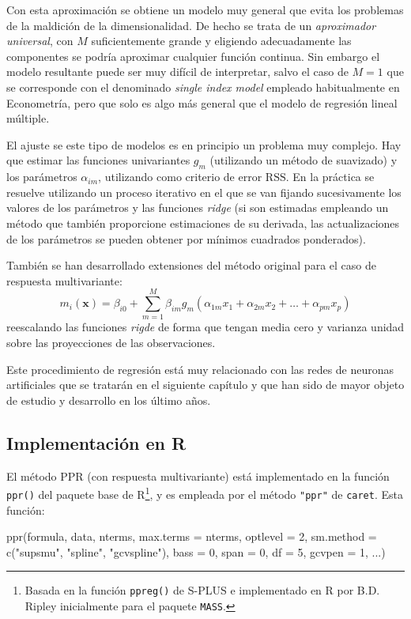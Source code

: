 \documentclass[
  spanish,
]{book}
\newenvironment{Shaded}{\begin{snugshade}}{\end{snugshade}}
\newcommand{\AttributeTok}[1]{\textcolor[rgb]{0.77,0.63,0.00}{#1}}
\newcommand{\DecValTok}[1]{\textcolor[rgb]{0.00,0.00,0.81}{#1}}
\newcommand{\FunctionTok}[1]{\textcolor[rgb]{0.00,0.00,0.00}{#1}}
\newcommand{\NormalTok}[1]{#1}
\newcommand{\StringTok}[1]{\textcolor[rgb]{0.31,0.60,0.02}{#1}}
\theoremstyle{break}
\theoremstyle{definition}
\theoremstyle{definition}
\theoremstyle{definition}
\theoremstyle{definition}
\theoremstyle{remark}
\begin{document}
Con esta aproximación se obtiene un modelo muy general que evita los problemas de la maldición de la dimensionalidad.
De hecho se trata de un \emph{aproximador universal}, con \(M\) suficientemente grande y eligiendo adecuadamente las componentes se podría aproximar cualquier función continua.
Sin embargo el modelo resultante puede ser muy difícil de interpretar, salvo el caso de \(M=1\) que se corresponde con el denominado \emph{single index model} empleado habitualmente en Econometría, pero que solo es algo más general que el modelo de regresión lineal múltiple.

El ajuste se este tipo de modelos es en principio un problema muy complejo.
Hay que estimar las funciones univariantes \(g_m\) (utilizando un método de suavizado) y los parámetros \(\alpha_{im}\), utilizando como criterio de error \(\mbox{RSS}\).
En la práctica se resuelve utilizando un proceso iterativo en el que se van fijando sucesivamente los valores de los parámetros y las funciones \emph{ridge} (si son estimadas empleando un método que también proporcione estimaciones de su derivada, las actualizaciones de los parámetros se pueden obtener por mínimos cuadrados ponderados).

También se han desarrollado extensiones del método original para el caso de respuesta multivariante:
\[m_i(\mathbf{x}) = \beta_{i0} + \sum_{m=1}^M \beta_{im} g_m (\alpha_{1m}x_1 + \alpha_{2m}x_2 + \ldots + \alpha_{pm}x_p)\]
reescalando las funciones \emph{rigde} de forma que tengan media cero y varianza unidad sobre las proyecciones de las observaciones.

Este procedimiento de regresión está muy relacionado con las redes de neuronas artificiales que se tratarán en el siguiente capítulo y que han sido de mayor objeto de estudio y desarrollo en los último años.

\hypertarget{implementaciuxf3n-en-r-1}{%
\subsection{Implementación en R}\label{implementaciuxf3n-en-r-1}}

El método PPR (con respuesta multivariante) está implementado en la función \texttt{ppr()} del paquete base de R\footnote{Basada en la función \texttt{ppreg()} de S-PLUS e implementado en R por B.D. Ripley inicialmente para el paquete \texttt{MASS}.}, y es empleada por el método \texttt{"ppr"} de \texttt{caret}.
Esta función:

\begin{Shaded}
\begin{Highlighting}[]
\FunctionTok{ppr}\NormalTok{(formula, data, nterms, }\AttributeTok{max.terms =}\NormalTok{ nterms, }\AttributeTok{optlevel =} \DecValTok{2}\NormalTok{,}
    \AttributeTok{sm.method =} \FunctionTok{c}\NormalTok{(}\StringTok{"supsmu"}\NormalTok{, }\StringTok{"spline"}\NormalTok{, }\StringTok{"gcvspline"}\NormalTok{),}
    \AttributeTok{bass =} \DecValTok{0}\NormalTok{, }\AttributeTok{span =} \DecValTok{0}\NormalTok{, }\AttributeTok{df =} \DecValTok{5}\NormalTok{, }\AttributeTok{gcvpen =} \DecValTok{1}\NormalTok{, ...)}
\end{Highlighting}
\end{Shaded}
\end{document}

